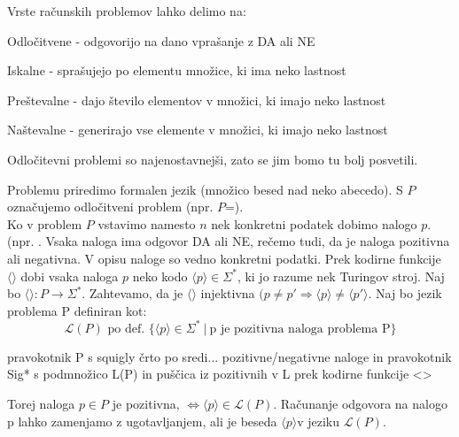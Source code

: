 \documentclass[10pt,a4paper,oneside]{book}
\begin{document}
Vrste računskih problemov lahko delimo na:
\begin{items}
\item Odločitvene - odgovorijo na dano vprašanje z DA ali NE %
\item Iskalne - sprašujejo po elementu množice, ki ima neko lastnost
\item Preštevalne - dajo število elementov v množici, ki imajo neko lastnost
\item Naštevalne - generirajo vse elemente v množici, ki imajo neko lastnost
\end{items}
Odločitevni problemi so najenostavnejši, zato se jim bomo tu bolj posvetili.

Problemu priredimo formalen jezik (množico besed nad neko abecedo).
\br
S $P$ označujemo odločitveni problem (npr. $P$=).\\
Ko v problem $P$ vstavimo namesto $n$ nek konkretni podatek dobimo nalogo $p$. (npr. . Vsaka naloga ima odgovor DA ali NE, rečemo tudi, da je naloga pozitivna ali negativna.
V opisu naloge so vedno konkretni podatki.
Prek kodirne funkcije $\langle\rangle$ dobi vsaka naloga $p$ neko kodo $\langle p\rangle\in\Sigma^*$, ki jo razume nek Turingov stroj.
Naj bo $\langle \rangle :P\rightarrow \Sigma^*$. Zahtevamo, da je $\langle\rangle$ injektivna $(p \neq p' \Rightarrow \langle p \rangle \neq \langle p' \rangle$.%
Naj bo jezik problema P definiran kot:
\[ \mathcal{L}(P) \mbox{ po def. } \{ \langle p \rangle \in \Sigma^*\ |\ \mbox{p je pozitivna naloga problema P} \} \]

\fixme pravokotnik P s squigly črto po sredi... pozitivne/negativne naloge in pravokotnik Sig* s podmnožico L(P) in puščica iz pozitivnih v L prek kodirne funkcije <>

Torej naloga $p\in P$ je pozitivna, $\Leftrightarrow \langle p \rangle \in \mathcal{L}(P)$.
Računanje odgovora na nalogo p lahko zamenjamo z ugotavljanjem, ali je beseda $\langle p \rangle$v jeziku $\mathcal{L}(P)$.
\end{document}
